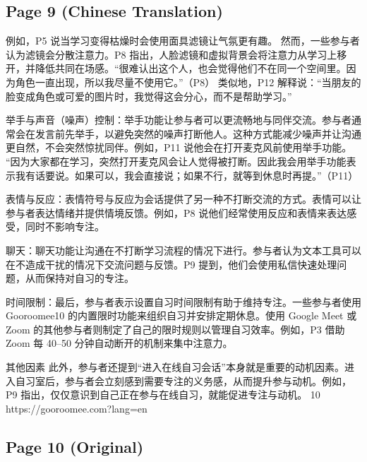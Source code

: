 \documentclass[12pt]{ctexart}
\begin{document}
\subsection*{Page 9 (Chinese Translation)}

例如，P5 说当学习变得枯燥时会使用面具滤镜让气氛更有趣。
然而，一些参与者认为滤镜会分散注意力。P8 指出，人脸滤镜和虚拟背景会将注意力从学习上移开，并降低共同在场感。“很难认出这个人，也会觉得他们不在同一个空间里。因为角色一直出现，所以我尽量不使用它。”（P8）
类似地，P12 解释说：“当朋友的脸变成角色或可爱的图片时，我觉得这会分心，而不是帮助学习。”

举手与声音（噪声）控制：举手功能让参与者可以更流畅地与同伴交流。参与者通常会在发言前先举手，以避免突然的噪声打断他人。这种方式能减少噪声并让沟通更自然，不会突然惊扰同伴。例如，P11 说他会在打开麦克风前使用举手功能。
“因为大家都在学习，突然打开麦克风会让人觉得被打断。因此我会用举手功能表示我有话要说。如果可以，我会直接说；如果不行，就等到休息时再提。”（P11）

表情与反应：表情符号与反应为会话提供了另一种不打断交流的方式。表情可以让参与者表达情绪并提供情境反馈。例如，P8 说他们经常使用反应和表情来表达感受，同时不影响专注。

聊天：聊天功能让沟通在不打断学习流程的情况下进行。参与者认为文本工具可以在不造成干扰的情况下交流问题与反馈。P9 提到，他们会使用私信快速处理问题，从而保持对自习的专注。

时间限制：最后，参与者表示设置自习时间限制有助于维持专注。一些参与者使用 Gooroomee10 的内置限时功能来组织自习并安排定期休息。使用 Google Meet 或 Zoom 的其他参与者则制定了自己的限时规则以管理自习效率。例如，P3 借助 Zoom 每 40–50 分钟自动断开的机制来集中注意力。

其他因素
此外，参与者还提到“进入在线自习会话”本身就是重要的动机因素。进入自习室后，参与者会立刻感到需要专注的义务感，从而提升参与动机。例如，P9 指出，仅仅意识到自己正在参与在线自习，就能促进专注与动机。
10 https://gooroomee.com?lang=en

\subsection*{Page 10 (Original)}
\end{document}
